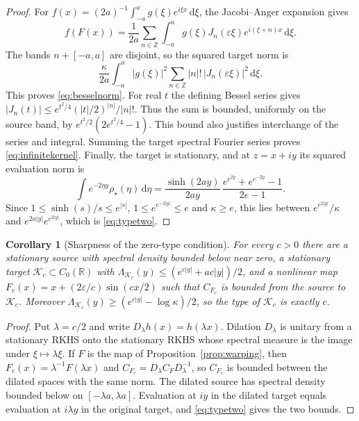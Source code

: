 \documentclass[11pt,a4paper]{article}
\newtheorem{corollary}[theorem]{Corollary}
\theoremstyle{remark}
\newcommand{\R}{\mathbb R}
\newcommand{\dd}{\,\mathrm d}
\begin{document}
\begin{proof}
For $f(x)=(2a)^{-1}\int_{-a}^ag(\xi)e^{i\xi x}\dd\xi$,
the Jacobi--Anger expansion gives
\[
 f(F(x))=\frac1{2a}\sum_{n\in\mathbb Z}
   \int_{-a}^a g(\xi)J_n(\varepsilon\xi)e^{i(\xi+n)x}\dd\xi .
\]
The bands $n+[-a,a]$ are disjoint, so the squared target norm is
\[
 \frac \kappa{2a}\int_{-a}^a|g(\xi)|^2
       \sum_{n\in\mathbb Z}|n|!\,|J_n(\varepsilon\xi)|^2\dd\xi .
\]
This proves \eqref{eq:besselnorm}. For real $t$ the defining
Bessel series gives
$|J_n(t)|\le e^{t^2/4}(|t|/2)^{|n|}/|n|!$.
Thus the sum is bounded, uniformly on the source band, by
$e^{t^2/2}(2e^{t^2/4}-1)$.
This bound also justifies interchange of the series and integral.
Summing the target spectral Fourier series proves
\eqref{eq:infinitekernel}. Finally, the target is stationary, and at
$z=x+iy$ its squared evaluation norm is
\[
 \int e^{-2\eta y}\rho_\star(\eta)\dd\eta
 =\frac{\sinh(2ay)}{2ay}\,
   \frac{e^{e^{2y}}+e^{e^{-2y}}-1}{2e-1}.
\]
Since $1\le\sinh(s)/s\le e^{|s|}$, $1\le e^{e^{-2|y|}}\le e$ and
$\kappa\ge e$, this lies between $e^{e^{2|y|}}/\kappa$ and
$e^{2a|y|}e^{e^{2|y|}}$, which is \eqref{eq:typetwo}.
\end{proof}

\begin{corollary}[Sharpness of the zero-type condition]\label{cor:sharp}
For every $c>0$ there are a stationary source with spectral density
bounded below near zero, a stationary target $\mathcal K_c\subset
C_0(\R)$ with $\Lambda_{\mathcal K_c}(y)\le(e^{c|y|}+ac|y|)/2$, and a
nonlinear map $F_c(x)=x+(2\varepsilon/c)\sin(cx/2)$ such that $C_{F_c}$
is bounded from the source to $\mathcal K_c$. Moreover
$\Lambda_{\mathcal K_c}(y)\ge(e^{c|y|}-\log\kappa)/2$, so the type of
$\mathcal K_c$ is exactly $c$.
\end{corollary}

\begin{proof}
Put $\lambda=c/2$ and write $D_\lambda h(x)=h(\lambda x)$. Dilation
$D_\lambda$ is unitary from a stationary RKHS onto the stationary RKHS
whose spectral measure is the image under $\xi\mapsto\lambda\xi$. If
$F$ is the map of Proposition~\ref{prop:warping}, then
$F_c(x)=\lambda^{-1}F(\lambda x)$ and
$C_{F_c}=D_\lambda C_FD_{\lambda}^{-1}$, so $C_{F_c}$ is bounded
between the dilated spaces with the same norm. The dilated source has
spectral density bounded below on $[-\lambda a,\lambda a]$. Evaluation
at $iy$ in the dilated target equals evaluation at $i\lambda y$ in the
original target, and \eqref{eq:typetwo} gives the two bounds.
\end{proof}
\end{document}
